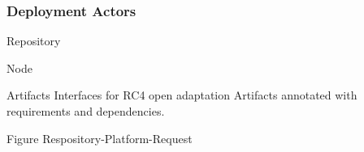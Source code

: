 \subsubsection{Deployment Actors}

Repository


Node

Artifacts
Interfaces for RC4 open adaptation
Artifacts annotated with requirements and dependencies.




Figure Respository-Platform-Request
